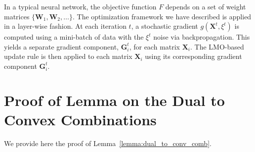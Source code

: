 \documentclass[smallextended,referee,envcountsect]{svjour3}
\def\mG{{\bm{G}}}
\def\mW{{\bm{W}}}
\def\mX{{\bm{X}}}
\newcommand{\lemmaref}[1]{Lemma~\ref{#1}}
\begin{document}
 In a typical neural network, the objective function $F$ depends on a set of weight matrices $\{ \mW_1, \mW_2, \ldots \}$. The optimization framework we have described is applied in a layer-wise fashion. At each iteration $t$, a stochastic gradient $g(\mX^t, \xi^t)$ is computed using a mini-batch of data with the $\xi^t$ noise via backpropagation. This yields a separate gradient component, $\mG_i^t$, for each matrix $\mX_i$. The LMO-based update rule is then applied to each matrix $\mX_i$ using its corresponding gradient component $\mG_i^t$.
 
 \section{Proof of Lemma on the Dual to Convex Combinations}\label{sec:proof_dual_conv_comb}
 
 We provide here the proof of \lemmaref{lemma:dual_to_conv_comb}.
 
\end{document}
